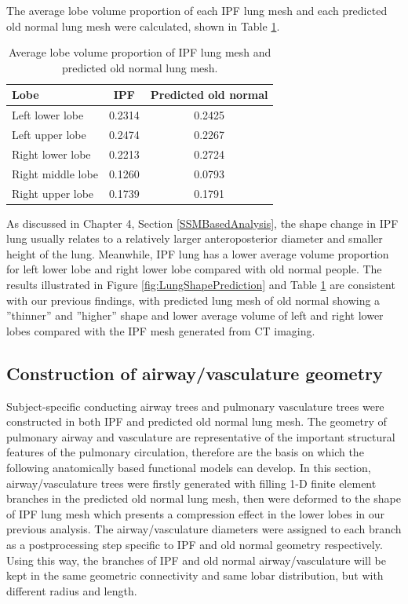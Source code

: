 The average lobe volume proportion of each IPF lung mesh and each predicted old normal lung mesh were calculated, shown in Table \ref{tab:AverageLobeVolume_Predicted}.

\begin{table}[htbp]
\centering
\caption{Average lobe volume proportion of IPF lung mesh and predicted old normal lung mesh.}
\label{tab:AverageLobeVolume_Predicted}
\begin{tabular}{| l | c | c |}
\hline
\bf{Lobe} & \bf{IPF} & \bf{Predicted old normal} \\
\hline
Left lower lobe & 0.2314 & 0.2425\\
\hline
Left upper lobe	& 0.2474 & 0.2267\\
\hline
Right lower lobe	& 0.2213 & 0.2724\\
\hline
Right middle lobe	& 0.1260 & 0.0793\\
\hline
Right upper lobe	& 0.1739 & 0.1791\\
\hline
\end{tabular}
\end{table}

As discussed in Chapter 4, Section \ref{SSMBasedAnalysis}, the shape change in IPF lung usually relates to a relatively larger anteroposterior diameter and smaller height of the lung. Meanwhile, IPF lung has a lower average volume proportion for left lower lobe and right lower lobe compared with old normal people. The results illustrated in Figure \ref{fig:LungShapePrediction} and Table \ref{tab:AverageLobeVolume_Predicted} are consistent with our previous findings, with predicted lung mesh of old normal showing a ''thinner'' and ''higher'' shape and lower average volume of left and right lower lobes compared with the IPF mesh generated from CT imaging. 

\subsection{Construction of airway/vasculature geometry} \label{AirwayVesselGeometry}
Subject-specific conducting airway trees and pulmonary vasculature trees were constructed in both IPF and predicted old normal lung mesh. The  geometry of pulmonary airway and vasculature are representative of the important structural features of the pulmonary circulation, therefore are the basis on which the following anatomically based functional models can develop. In this section, airway/vasculature trees were firstly generated with filling 1-D finite element branches in the predicted old normal lung mesh, then were deformed to the shape of IPF lung mesh which presents a compression effect in the lower lobes in our previous analysis. The airway/vasculature diameters were assigned to each branch as a postprocessing step specific to IPF and old normal geometry respectively. Using this way, the branches of IPF and old normal airway/vasculature will be kept in the same geometric connectivity and same lobar distribution, but with different radius and length. 

